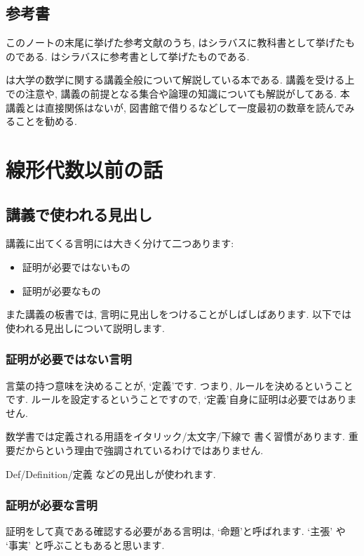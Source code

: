 \section{参考書}
このノートの末尾に挙げた参考文献のうち,
\cite{978-4-7806-0772-7}
はシラバスに教科書として挙げたものである.
\cite{978-4-7806-0164-0,978-4-535-78682-0}
はシラバスに参考書として挙げたものである.

\cite{978-4-535-78682-0}は大学の数学に関する講義全般について解説している本である.
講義を受ける上での注意や,
講義の前提となる集合や論理の知識についても解説がしてある.
本講義とは直接関係はないが,
図書館で借りるなどして一度最初の数章を読んでみることを勧める.

\tableofcontents

\chapter{線形代数以前の話}

\section{講義で使われる見出し}
講義に出てくる言明には大きく分けて二つあります:
\begin{itemize}
 \item 証明が必要ではないもの
 \item 証明が必要なもの
\end{itemize}
また講義の板書では,
言明に見出しをつけることがしばしばあります.
以下では使われる見出しについて説明します.
\subsection{証明が必要ではない言明}
言葉の持つ意味を決めることが,
`定義'です.
つまり, ルールを決めるということです.
ルールを設定するということですので,
`定義'自身に証明は必要ではありません.

数学書では定義される用語をイタリック/太文字/下線で
書く習慣があります.
重要だからという理由で強調されているわけではありません.

Def/Definition/定義 などの見出しが使われます.

\subsection{証明が必要な言明}
証明をして真である確認する必要がある言明は,
`命題'と呼ばれます.
`主張' や `事実' と呼ぶこともあると思います.

